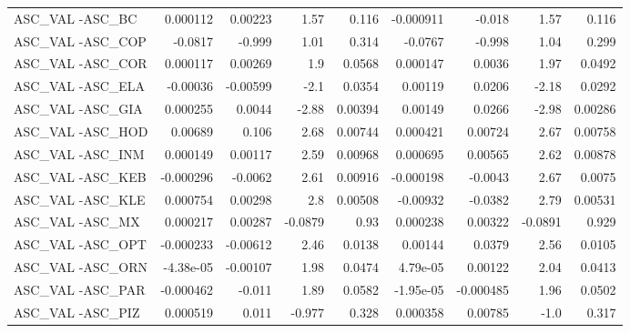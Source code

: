 \begin{tabular}{lrrrrrrrr}
ASC\_VAL -ASC\_BC                        &    0.000112 &      0.00223 &    1.57 &    0.116 &  -0.000911 &      -0.018 &         1.57 &         0.116 \\
ASC\_VAL -ASC\_COP                       &     -0.0817 &       -0.999 &    1.01 &    0.314 &    -0.0767 &      -0.998 &         1.04 &         0.299 \\
ASC\_VAL -ASC\_COR                       &    0.000117 &      0.00269 &     1.9 &   0.0568 &   0.000147 &      0.0036 &         1.97 &        0.0492 \\
ASC\_VAL -ASC\_ELA                       &    -0.00036 &     -0.00599 &    -2.1 &   0.0354 &    0.00119 &      0.0206 &        -2.18 &        0.0292 \\
ASC\_VAL -ASC\_GIA                       &    0.000255 &       0.0044 &   -2.88 &  0.00394 &    0.00149 &      0.0266 &        -2.98 &       0.00286 \\
ASC\_VAL -ASC\_HOD                       &     0.00689 &        0.106 &    2.68 &  0.00744 &   0.000421 &     0.00724 &         2.67 &       0.00758 \\
ASC\_VAL -ASC\_INM                       &    0.000149 &      0.00117 &    2.59 &  0.00968 &   0.000695 &     0.00565 &         2.62 &       0.00878 \\
ASC\_VAL -ASC\_KEB                       &   -0.000296 &      -0.0062 &    2.61 &  0.00916 &  -0.000198 &     -0.0043 &         2.67 &        0.0075 \\
ASC\_VAL -ASC\_KLE                       &    0.000754 &      0.00298 &     2.8 &  0.00508 &   -0.00932 &     -0.0382 &         2.79 &       0.00531 \\
ASC\_VAL -ASC\_MX                        &    0.000217 &      0.00287 & -0.0879 &     0.93 &   0.000238 &     0.00322 &      -0.0891 &         0.929 \\
ASC\_VAL -ASC\_OPT                       &   -0.000233 &     -0.00612 &    2.46 &   0.0138 &    0.00144 &      0.0379 &         2.56 &        0.0105 \\
ASC\_VAL -ASC\_ORN                       &   -4.38e-05 &     -0.00107 &    1.98 &   0.0474 &   4.79e-05 &     0.00122 &         2.04 &        0.0413 \\
ASC\_VAL -ASC\_PAR                       &   -0.000462 &       -0.011 &    1.89 &   0.0582 &  -1.95e-05 &   -0.000485 &         1.96 &        0.0502 \\
ASC\_VAL -ASC\_PIZ                       &    0.000519 &        0.011 &  -0.977 &    0.328 &   0.000358 &     0.00785 &         -1.0 &         0.317 \\

\end{tabular}
